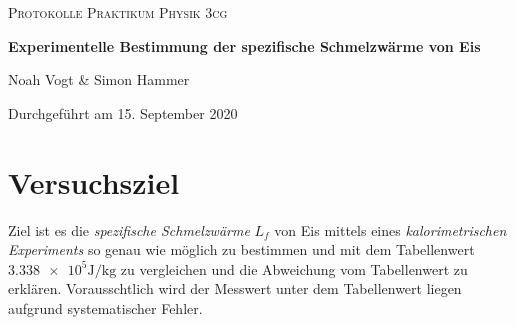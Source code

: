 \documentclass[a4paper,12pt]{article}
\begin{document}
\begin{titlepage}

\vspace*{1cm}
	\centering
	
	{\scshape\Large Protokolle Praktikum Physik 3cg \par}
	\vspace{0.5cm}
	{\huge\bfseries Experimentelle Bestimmung der spezifische Schmelzwärme von Eis\par}
	\vspace{0.5cm}
	{\Large Noah Vogt \& Simon Hammer\par}
	\vspace{0.5cm}

	{\large Durchgeführt am 15. September 2020\par}
	
\end{titlepage}

\tableofcontents
\pagebreak

\section{Versuchsziel}
Ziel ist es die \textit{spezifische Schmelzwärme} $L_f$ von Eis mittels eines \textit{kalorimetrischen Experiments} so genau wie möglich zu bestimmen und mit dem Tabellenwert $ \num{3.338 e5}\si{\J\per\kg} $ zu vergleichen und die Abweichung vom Tabellenwert zu erklären. Vorausschtlich wird der Messwert unter dem Tabellenwert liegen aufgrund systematischer Fehler.
\end{document}
